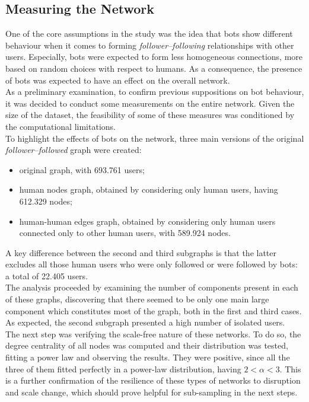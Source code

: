 \documentclass[12pt, a4paper]{article}
\begin{document}
	\subsection{Measuring the Network}
    	One of the core assumptions in the study was the idea that bots show different behaviour when it comes to forming \textit{follower--following} relationships with other users. Especially, bots were expected to form less homogeneous connections, more based on random choices with respect to humans. As a consequence, the presence of bots was expected to have an effect on the overall network.\\
    	As a preliminary examination, to confirm previous suppositions on bot behaviour, it was decided to conduct some measurements on the entire network. Given the size of the dataset, the feasibility of some of these measures was conditioned by the computational limitations.\\
    	To highlight the effects of bots on the network, three main versions of the original \textit{follower--followed} graph were created: 
        \begin{itemize}
            \item original graph, with 693.761 users;
            \item human nodes graph, obtained by considering only human users, having 612.329 nodes;
            \item human-human edges graph, obtained by considering only human users connected only to other human users, with 589.924 nodes.
        \end{itemize}
        A key difference between the second and third subgraphs is that the latter excludes all those human users who were only followed or were followed by bots: a total of 22.405 users.\\
        The analysis proceeded by examining the number of components present in each of these graphs, discovering that there seemed to be only one main large component which constitutes most of the graph, both in the first and third cases. As expected, the second subgraph presented a high number of isolated users.\\
        The next step was verifying the scale-free nature of these networks. To do so, the degree centrality of all nodes was computed and their distribution was tested, fitting a power law and observing the results. They were positive, since all the three of them fitted perfectly in a power-law distribution, having \(2<\alpha<3\). This is a further confirmation of the resilience of these types of networks to disruption and scale change, which should prove helpful for sub-sampling in the next steps.\\
\end{document}
